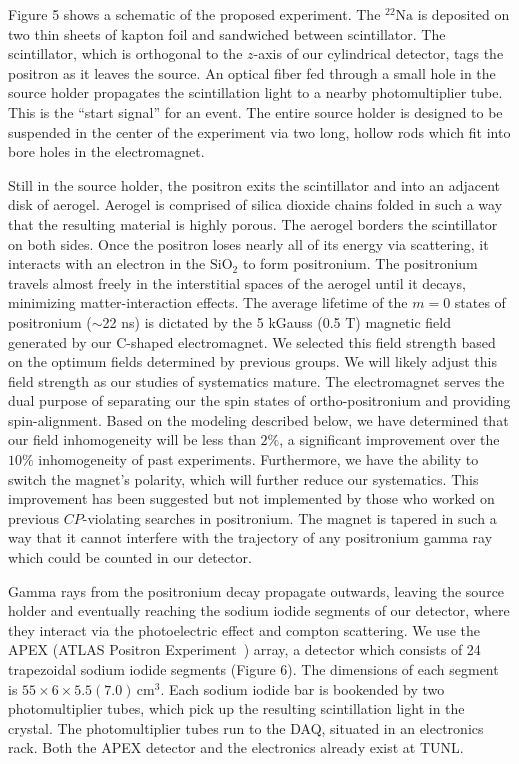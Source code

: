 Figure 5 shows a schematic of the proposed experiment. The $\mathrm{{}^{22}{Na}}$ is deposited on two thin sheets of kapton foil and sandwiched between scintillator. The scintillator, which is orthogonal to the $z$-axis of our cylindrical detector, tags the positron as it leaves the source. An optical fiber fed through a small hole in the source holder propagates the scintillation light to a nearby photomultiplier tube. This is the ``start signal'' for an event. The entire source holder is designed to be suspended in the center of the experiment via two long, hollow rods which fit into bore holes in the electromagnet.

Still in the source holder, the positron exits the scintillator and into an adjacent disk of aerogel. Aerogel is comprised of silica dioxide chains folded in such a way that the resulting material is highly porous. The aerogel borders the scintillator on both sides. Once the positron loses nearly all of its energy via scattering, it interacts with an electron in the $\mathrm{SiO_{2}}$ to form positronium. The positronium travels almost freely in the interstitial spaces of the aerogel until it decays, minimizing matter-interaction effects. The average lifetime of the $m=0$ states of positronium ($\sim$22 ns) is dictated by the 5 kGauss (0.5 T) magnetic field generated by our C-shaped electromagnet. We selected this field strength based on the optimum fields determined by previous groups. We will likely adjust this field strength as our studies of systematics mature. The electromagnet serves the dual purpose of separating our the spin states of ortho-positronium and providing spin-alignment. Based on the modeling described below, we have determined that our field inhomogeneity will be less than $2\%$, a significant improvement over the $10\%$ inhomogeneity of past experiments. Furthermore, we have the ability to switch the magnet's polarity, which will further reduce our systematics. This improvement has been suggested but not implemented by those who worked on previous $CP$-violating searches in positronium. The magnet is tapered in such a way that it cannot interfere with the trajectory of any positronium gamma ray which could be counted in our detector.

Gamma rays from the positronium decay propagate outwards, leaving the source holder and eventually reaching the sodium iodide segments of our detector, where they interact via the photoelectric effect and compton scattering. We use the APEX (ATLAS Positron Experiment~\cite{Mercer1994491}) array, a detector which consists of 24 trapezoidal sodium iodide segments (Figure 6). The dimensions of each segment is $\mathrm{55{\times}6{\times}5.5(7.0)\,cm^3}$. Each sodium iodide bar is bookended by two photomultiplier tubes, which pick up the resulting scintillation light in the crystal. The photomultiplier tubes run to the DAQ, situated in an electronics rack. Both the APEX detector and the electronics already exist at TUNL. 

